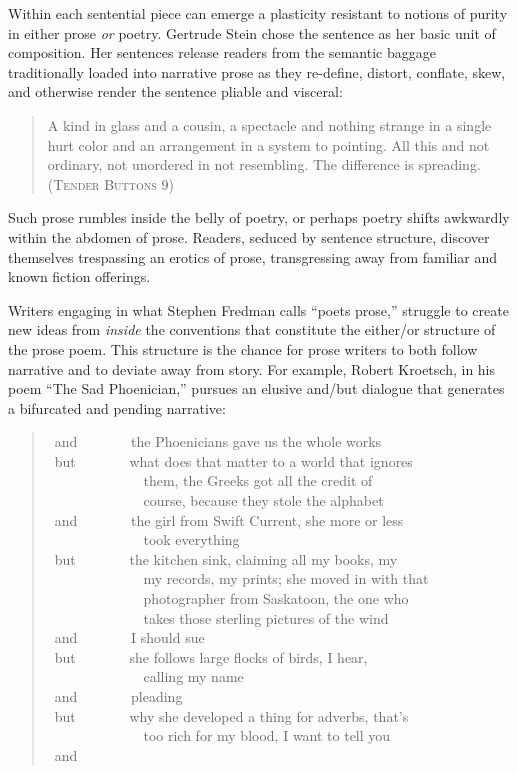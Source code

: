 \documentclass[
]{memoir}
\begin{document}
Within each sentential piece can emerge a plasticity resistant to
notions of purity in either prose \emph{or} poetry. Gertrude Stein chose
the sentence as her basic unit of composition. Her sentences release
readers from the semantic baggage traditionally loaded into narrative
prose as they re-define, distort, conflate, skew, and otherwise render
the sentence pliable and visceral:

\begin{quote}
A kind in glass and a cousin, a spectacle and nothing strange in a
single hurt color and an arrangement in a system to pointing. All this
and not ordinary, not unordered in not resembling. The difference is
spreading. (\textsc{Tender Buttons} 9)
\end{quote}

Such prose rumbles inside the belly of poetry, or perhaps poetry shifts
awkwardly within the abdomen of prose. Readers, seduced by sentence
structure, discover themselves trespassing an erotics of prose,
transgressing away from familiar and known fiction offerings.

Writers engaging in what Stephen Fredman calls ``poets prose,'' struggle
to create new ideas from \emph{inside} the conventions that constitute
the either/or structure of the prose poem. This structure is the chance
for prose writers to both follow narrative and to deviate away from
story. For example, Robert Kroetsch, in his poem ``The Sad Phoenician,''
pursues an elusive and/but dialogue that generates a bifurcated and
pending narrative:

\begin{verse}
 and        the Phoenicians gave us the whole works\\
 but        what does that matter to a world that ignores\\
              them, the Greeks got all the credit of\\
              course, because they stole the alphabet\\
 and        the girl from Swift Current, she more or less\\
              took everything\\
 but        the kitchen sink, claiming all my books, my\\
              my records, my prints; she moved in with that\\
              photographer from Saskatoon, the one who\\
              takes those sterling pictures of the wind\\
 and        I should sue\\
 but        she follows large flocks of birds, I hear,\\
              calling my name\\
 and        pleading\\
 but        why she developed a thing for adverbs, that’s\\
              too rich for my blood, I want to tell you\\
 and\\
\end{verse}
\end{document}
